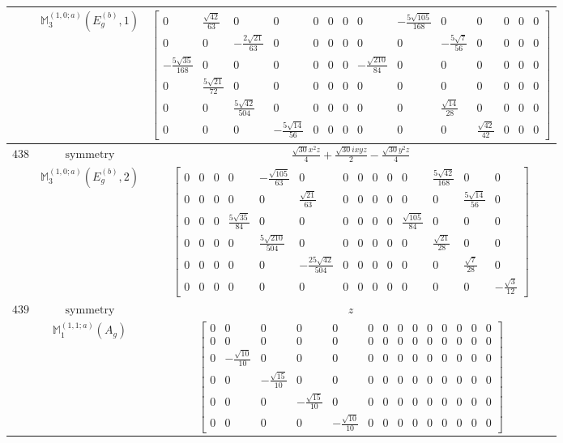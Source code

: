 \documentclass[fleqn,8pt,landscape]{jsarticle}
\begin{document}
\begin{longtable}{ccc}
$  $ & $ \mathbb{M}_{3}^{(1,0;a)}(E_{g}^{(b)},1) $ & $ \begin{bmatrix} 0 & \frac{\sqrt{42}}{63} & 0 & 0 & 0 & 0 & 0 & 0 & - \frac{5 \sqrt{105}}{168} & 0 & 0 & 0 & 0 & 0 \\ 0 & 0 & - \frac{2 \sqrt{21}}{63} & 0 & 0 & 0 & 0 & 0 & 0 & - \frac{5 \sqrt{7}}{56} & 0 & 0 & 0 & 0 \\ - \frac{5 \sqrt{35}}{168} & 0 & 0 & 0 & 0 & 0 & 0 & - \frac{\sqrt{210}}{84} & 0 & 0 & 0 & 0 & 0 & 0 \\ 0 & \frac{5 \sqrt{21}}{72} & 0 & 0 & 0 & 0 & 0 & 0 & 0 & 0 & 0 & 0 & 0 & 0 \\ 0 & 0 & \frac{5 \sqrt{42}}{504} & 0 & 0 & 0 & 0 & 0 & 0 & \frac{\sqrt{14}}{28} & 0 & 0 & 0 & 0 \\ 0 & 0 & 0 & - \frac{5 \sqrt{14}}{56} & 0 & 0 & 0 & 0 & 0 & 0 & \frac{\sqrt{42}}{42} & 0 & 0 & 0 \end{bmatrix} $ \\ \hline
$ 438 $ & $ \text{symmetry} $ & $ \frac{\sqrt{30} x^{2} z}{4} + \frac{\sqrt{30} i x y z}{2} - \frac{\sqrt{30} y^{2} z}{4} $ \\
$  $ & $ \mathbb{M}_{3}^{(1,0;a)}(E_{g}^{(b)},2) $ & $ \begin{bmatrix} 0 & 0 & 0 & 0 & - \frac{\sqrt{105}}{63} & 0 & 0 & 0 & 0 & 0 & 0 & \frac{5 \sqrt{42}}{168} & 0 & 0 \\ 0 & 0 & 0 & 0 & 0 & \frac{\sqrt{21}}{63} & 0 & 0 & 0 & 0 & 0 & 0 & \frac{5 \sqrt{14}}{56} & 0 \\ 0 & 0 & 0 & \frac{5 \sqrt{35}}{84} & 0 & 0 & 0 & 0 & 0 & 0 & \frac{\sqrt{105}}{84} & 0 & 0 & 0 \\ 0 & 0 & 0 & 0 & \frac{5 \sqrt{210}}{504} & 0 & 0 & 0 & 0 & 0 & 0 & \frac{\sqrt{21}}{28} & 0 & 0 \\ 0 & 0 & 0 & 0 & 0 & - \frac{25 \sqrt{42}}{504} & 0 & 0 & 0 & 0 & 0 & 0 & \frac{\sqrt{7}}{28} & 0 \\ 0 & 0 & 0 & 0 & 0 & 0 & 0 & 0 & 0 & 0 & 0 & 0 & 0 & - \frac{\sqrt{3}}{12} \end{bmatrix} $ \\ \hline
$ 439 $ & $ \text{symmetry} $ & $ z $ \\
$  $ & $ \mathbb{M}_{1}^{(1,1;a)}(A_{g}) $ & $ \begin{bmatrix} 0 & 0 & 0 & 0 & 0 & 0 & 0 & 0 & 0 & 0 & 0 & 0 & 0 & 0 \\ 0 & 0 & 0 & 0 & 0 & 0 & 0 & 0 & 0 & 0 & 0 & 0 & 0 & 0 \\ 0 & - \frac{\sqrt{10}}{10} & 0 & 0 & 0 & 0 & 0 & 0 & 0 & 0 & 0 & 0 & 0 & 0 \\ 0 & 0 & - \frac{\sqrt{15}}{10} & 0 & 0 & 0 & 0 & 0 & 0 & 0 & 0 & 0 & 0 & 0 \\ 0 & 0 & 0 & - \frac{\sqrt{15}}{10} & 0 & 0 & 0 & 0 & 0 & 0 & 0 & 0 & 0 & 0 \\ 0 & 0 & 0 & 0 & - \frac{\sqrt{10}}{10} & 0 & 0 & 0 & 0 & 0 & 0 & 0 & 0 & 0 \end{bmatrix} $ \\ \hline

\end{longtable}
\end{document}
